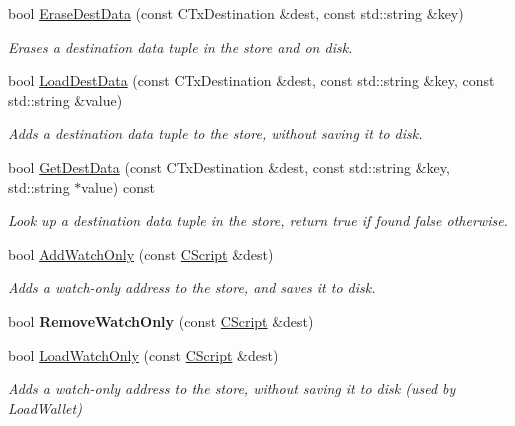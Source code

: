 \begin{DoxyCompactItemize}
\mbox{\label{class_c_wallet_a9a03cf9972842588178387839f0ded3c}} 
bool \mbox{\hyperlink{class_c_wallet_a9a03cf9972842588178387839f0ded3c}{Erase\+Dest\+Data}} (const C\+Tx\+Destination \&dest, const std\+::string \&key)
\begin{DoxyCompactList}\small\item\em Erases a destination data tuple in the store and on disk. \end{DoxyCompactList}\item 
\mbox{\label{class_c_wallet_a0d78de06c0b02f773b7ecbb21d42aada}} 
bool \mbox{\hyperlink{class_c_wallet_a0d78de06c0b02f773b7ecbb21d42aada}{Load\+Dest\+Data}} (const C\+Tx\+Destination \&dest, const std\+::string \&key, const std\+::string \&value)
\begin{DoxyCompactList}\small\item\em Adds a destination data tuple to the store, without saving it to disk. \end{DoxyCompactList}\item 
\mbox{\label{class_c_wallet_a8f82359f767da6eadeebd3f5efeed9d0}} 
bool \mbox{\hyperlink{class_c_wallet_a8f82359f767da6eadeebd3f5efeed9d0}{Get\+Dest\+Data}} (const C\+Tx\+Destination \&dest, const std\+::string \&key, std\+::string $\ast$value) const
\begin{DoxyCompactList}\small\item\em Look up a destination data tuple in the store, return true if found false otherwise. \end{DoxyCompactList}\item 
bool \mbox{\hyperlink{group__map_wallet_ga022f12d5f56bbe831136388e2ac19969}{Add\+Watch\+Only}} (const \mbox{\hyperlink{class_c_script}{C\+Script}} \&dest)
\begin{DoxyCompactList}\small\item\em Adds a watch-\/only address to the store, and saves it to disk. \end{DoxyCompactList}\item 
bool {\bfseries Remove\+Watch\+Only} (const \mbox{\hyperlink{class_c_script}{C\+Script}} \&dest)
\item 
bool \mbox{\hyperlink{group__map_wallet_gad6580f1844fc639389e1c6a1e2787ee6}{Load\+Watch\+Only}} (const \mbox{\hyperlink{class_c_script}{C\+Script}} \&dest)
\begin{DoxyCompactList}\small\item\em Adds a watch-\/only address to the store, without saving it to disk (used by Load\+Wallet) \end{DoxyCompactList}\item 

\end{DoxyCompactItemize}

